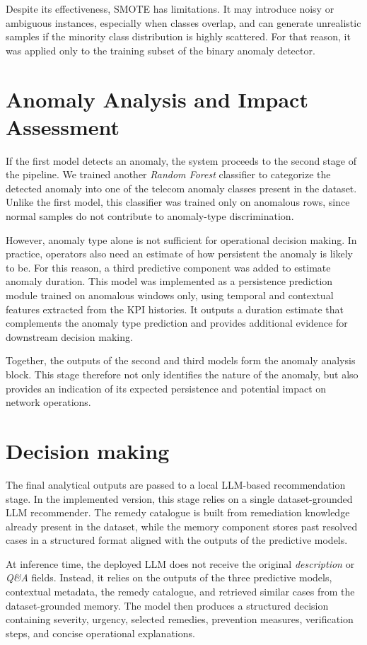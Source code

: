 Despite its effectiveness, SMOTE has limitations. It may introduce noisy or ambiguous instances, especially when classes overlap, and can generate unrealistic samples if the minority class distribution is highly scattered. For that reason, it was applied only to the training subset of the binary anomaly detector.

\section{Anomaly Analysis and Impact Assessment}

If the first model detects an anomaly, the system proceeds to the second stage of the pipeline. We trained another \textit{Random Forest} classifier to categorize the detected anomaly into one of the telecom anomaly classes present in the dataset. Unlike the first model, this classifier was trained only on anomalous rows, since normal samples do not contribute to anomaly-type discrimination.

However, anomaly type alone is not sufficient for operational decision making. In practice, operators also need an estimate of how persistent the anomaly is likely to be. For this reason, a third predictive component was added to estimate anomaly duration. This model was implemented as a persistence prediction module trained on anomalous windows only, using temporal and contextual features extracted from the KPI histories. It outputs a duration estimate that complements the anomaly type prediction and provides additional evidence for downstream decision making.

Together, the outputs of the second and third models form the anomaly analysis block. This stage therefore not only identifies the nature of the anomaly, but also provides an indication of its expected persistence and potential impact on network operations.

\section{Decision making}
The final analytical outputs are passed to a local LLM-based recommendation stage. In the implemented version, this stage relies on a single dataset-grounded LLM recommender. The remedy catalogue is built from remediation knowledge already present in the dataset, while the memory component stores past resolved cases in a structured format aligned with the outputs of the predictive models.

At inference time, the deployed LLM does not receive the original \textit{description} or \textit{Q\&A} fields. Instead, it relies on the outputs of the three predictive models, contextual metadata, the remedy catalogue, and retrieved similar cases from the dataset-grounded memory. The model then produces a structured decision containing severity, urgency, selected remedies, prevention measures, verification steps, and concise operational explanations.


